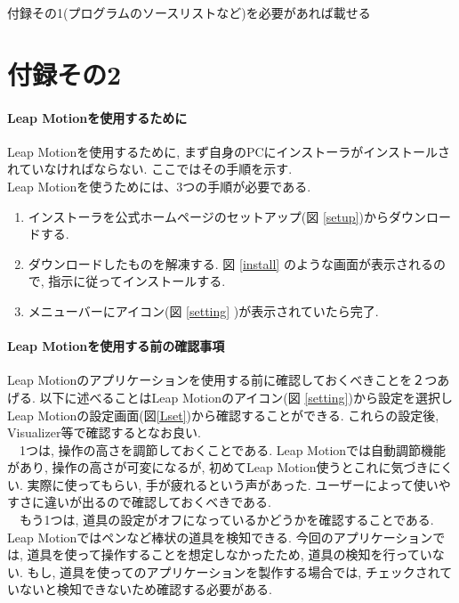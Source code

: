 \documentclass{funthesis}
\begin{document}
付録その1(プログラムのソースリストなど)を必要があれば載せる

\chapter*{付録その2}
\subsubsection{Leap Motionを使用するために}
Leap Motionを使用するために, まず自身のPCにインストーラがインストールされていなければならない. ここではその手順を示す.\\



Leap Motionを使うためには、3つの手順が必要である. 
\begin{enumerate}
 \item インストーラを公式ホームページのセットアップ(図 \ref{setup})からダウンロードする.
 \item ダウンロードしたものを解凍する. 図 \ref{install} のような画面が表示されるので, 指示に従ってインストールする. 
 \item メニューバーにアイコン(図 \ref{setting} )が表示されていたら完了. 
\end{enumerate}

\subsubsection{Leap Motionを使用する前の確認事項}
Leap Motionのアプリケーションを使用する前に確認しておくべきことを２つあげる. 以下に述べることはLeap Motionのアイコン(図 \ref{setting})から設定を選択しLeap Motionの設定画面(図\ref{Lset})から確認することができる. これらの設定後, Visualizer等で確認するとなお良い. \\
　1つは, 操作の高さを調節しておくことである. Leap Motionでは自動調節機能があり, 操作の高さが可変になるが, 初めてLeap Motion使うとこれに気づきにくい. 実際に使ってもらい, 手が疲れるという声があった. ユーザーによって使いやすさに違いが出るので確認しておくべきである. \\
　もう1つは, 道具の設定がオフになっているかどうかを確認することである. Leap Motionではペンなど棒状の道具を検知できる. 今回のアプリケーションでは, 道具を使って操作することを想定しなかったため, 道具の検知を行っていない. もし, 道具を使ってのアプリケーションを製作する場合では, チェックされていないと検知できないため確認する必要がある. \\
\end{document}

